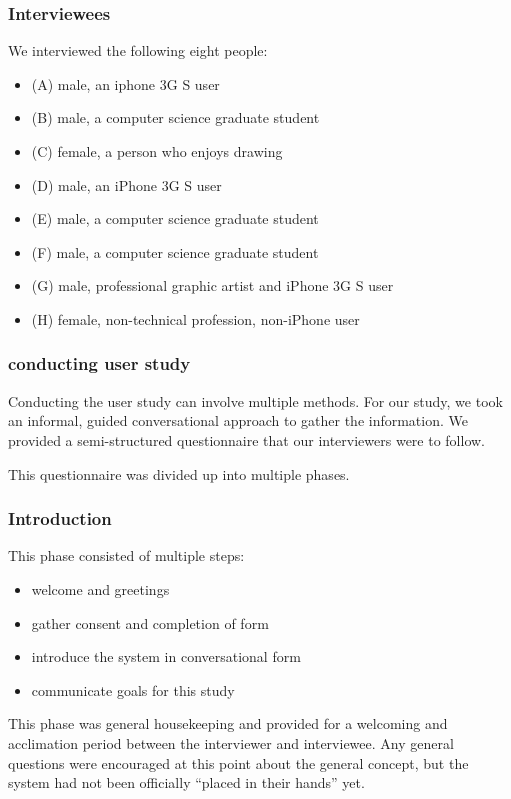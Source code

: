 \documentclass{chi2009}
\begin{document}
\subsubsection{Interviewees}
We interviewed the following eight people:

\begin{itemize}
\item (A) male, an iphone 3G S user
\item (B) male, a computer science graduate student
\item (C) female, a person who enjoys drawing
\item (D) male, an iPhone 3G S user
\item (E) male, a computer science graduate student
\item (F) male, a computer science graduate student
\item (G) male, professional graphic artist and iPhone 3G S user
\item (H) female, non-technical profession, non-iPhone user
\end{itemize}

\subsubsection{conducting user study}

Conducting the user study can involve multiple methods.  For our study, we took
an informal, guided conversational approach to gather the information.  We
provided a semi-structured questionnaire that our interviewers were to follow.

This questionnaire was divided up into multiple phases.

\subsubsection{ Introduction }

This phase consisted of multiple steps:
\begin{itemize}
\item welcome and greetings
\item gather consent and completion of form
\item introduce the system in conversational form
\item communicate goals for this study
\end{itemize}

This phase was general housekeeping and provided for a welcoming and
acclimation period between the interviewer and interviewee.  Any general
questions were encouraged at this point about the general concept, but the
system had not been officially ``placed in their hands'' yet.
\end{document}
